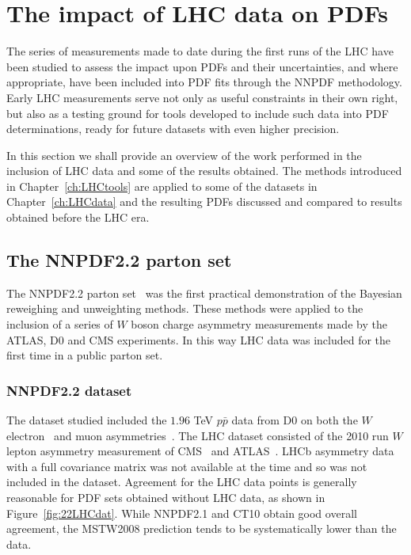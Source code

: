 \chapter{The impact of LHC data on PDFs}
\label{ch:LHCimpact}
The series of measurements made to date during the first runs of the LHC have been studied to assess the impact upon PDFs and their uncertainties, and where appropriate, have been included into PDF fits through the NNPDF methodology. Early LHC measurements serve not only as useful constraints in their own right, but also as a testing ground for tools developed to include such data into PDF determinations, ready for future datasets with even higher precision. 

In this section we shall provide an overview of the work performed in the inclusion of LHC data and some of the results obtained. The methods introduced in Chapter~\ref{ch:LHCtools} are applied to some of the datasets in Chapter~\ref{ch:LHCdata} and the resulting PDFs discussed and compared to results obtained before the LHC era.

\section{The NNPDF2.2 parton set}
The NNPDF2.2 parton set~\cite{Ball:2011gg} was the first practical demonstration of the Bayesian reweighing and unweighting methods. These methods were applied to the inclusion of a series of $W$ boson charge asymmetry measurements made by the ATLAS, D0 and CMS experiments. In this way LHC data was included for the first time in a public parton set.
\subsection{NNPDF2.2 dataset}

The dataset studied included the $1.96$ TeV $p\bar{p}$ data from D0 on both the $W$ electron~\cite{Abazov:2008qv} and muon asymmetries~\cite{Abazov:2007pm}. The LHC dataset consisted of the 2010 run $W$ lepton asymmetry measurement of CMS~\cite{Chatrchyan:2011jz} and ATLAS~\cite{Aad:2011yna}. LHCb asymmetry data with a full covariance matrix was not available at the time and so was not included in the dataset. Agreement for the LHC data points is generally reasonable for PDF sets obtained without LHC data, as shown in Figure~\ref{fig:22LHCdat}. While NNPDF2.1 and CT10 obtain good overall agreement, the MSTW2008 prediction tends to be systematically lower than the data. 


